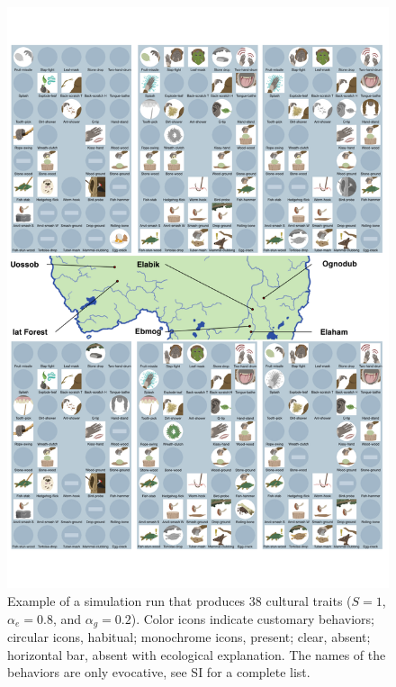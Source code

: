 \documentclass[9pt,twocolumn,twoside,]{pnas-new}
\begin{document}
\begin{figure}[h!]
\begin{center}
\includegraphics[width=13.8cm]{figures/figure_2.pdf}
\caption{Example of a simulation run that produces 38 cultural traits ($S=1$, $\alpha_e=0.8$, and $\alpha_g=0.2$). Color icons indicate customary behaviors; circular icons, habitual; monochrome icons, present; clear, absent;  horizontal bar, absent with ecological explanation. The names of the behaviors are only evocative, see SI for a complete list.}
\label{Figure2}
\end{center}
\end{figure}
\end{document}
